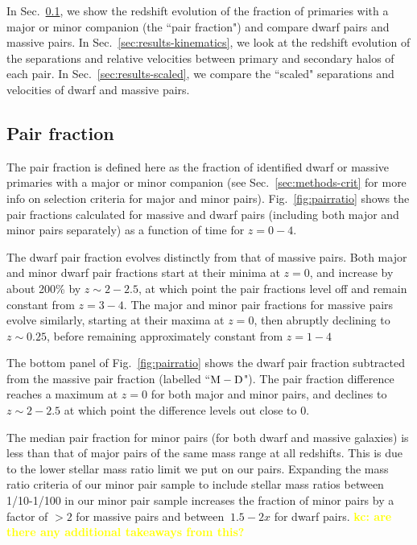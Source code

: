\documentclass[twocolumn]{aastex631}
\newcommand{\kc}[1]{\textcolor{yellow}{\textbf{kc: #1}} }
\begin{document}
In Sec.~\ref{sec:results-frac}, we show the redshift evolution of the fraction of primaries with a major or minor companion (the ``pair fraction") and compare dwarf pairs and massive pairs.
In Sec.~\ref{sec:results-kinematics}, we look at the redshift evolution of the separations and relative velocities between primary and secondary halos of each pair. %
In Sec.~\ref{sec:results-scaled}, we compare the ``scaled" separations and velocities of dwarf and massive pairs.

\subsection{Pair fraction}\label{sec:results-frac}
The pair fraction is defined here as the fraction of identified dwarf or massive primaries with a major or minor companion (see Sec.~\ref{sec:methods-crit} for more info on selection criteria for major and minor pairs). 
Fig.~\ref{fig:pairratio} shows the pair fractions calculated for massive and dwarf pairs (including both major and minor pairs separately) as a function of time for $z=0-4$. 

The dwarf pair fraction evolves distinctly from that of massive pairs.
Both major and minor dwarf pair fractions start at their minima at $z=0$, and increase by about 200\% by $z\sim2-2.5$, at which point the pair fractions level off and remain constant from $z=3-4$. 
The major and minor pair fractions for massive pairs evolve similarly, starting at their maxima at $z=0$, then abruptly declining to $z\sim0.25$, before remaining approximately constant from $z=1-4$ %

The bottom panel of Fig.~\ref{fig:pairratio} shows the dwarf pair fraction subtracted from the massive pair fraction (labelled ``$\rm M-D$"). 
The pair fraction difference reaches a maximum at $z=0$ for both major and minor pairs, and declines to $z\sim2-2.5$ at which point the difference levels out close to 0. 

The median pair fraction for minor pairs (for both dwarf and massive galaxies) is less than that of major pairs of the same mass range at all redshifts. This is due to the lower stellar mass ratio limit we put on our pairs. 
Expanding the mass ratio criteria of our minor pair sample to include stellar mass ratios between 1/10-1/100 in our minor pair sample increases the fraction of minor pairs by a factor of $>2$ for massive pairs and between $~1.5-2x$ for dwarf pairs. \kc{are there any additional takeaways from this? }
\end{document}
